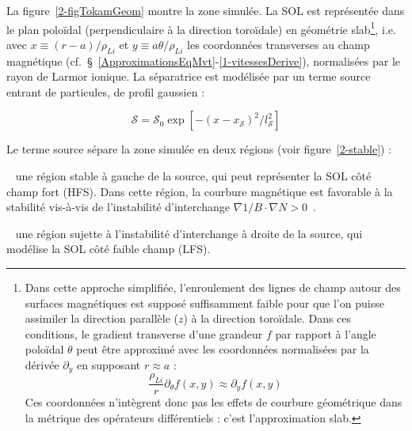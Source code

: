 \begin{refsection}
La figure~\ref{2-figTokamGeom} montre la zone simulée. La SOL est représentée dans le plan
poloïdal (perpendiculaire à la direction toroïdale)
en géométrie slab\footnote{Dans cette approche simplifiée, l'enroulement des
lignes de champ autour des surfaces magnétiques est supposé suffisamment
faible pour que l'on puisse assimiler la direction parallèle ($z$) à la
direction toroïdale. Dans ces conditions, le gradient transverse d'une
grandeur $f$ par rapport à l'angle poloïdal $\theta$ peut être approximé avec
les coordonnées normalisées par la dérivée $\partial_y$ en supposant $r\approx
a$ :
$$\frac{\rho_{Li}}{r}\partial_\theta f(x,y)\approx\partial_y
f(x,y)$$
Ces coordonnées n'intègrent donc pas les effets de courbure géométrique dans
la métrique des opérateurs différentiels : c'est l'approximation slab.}, i.e.
avec $x\equiv(r-a)/\rho_{Li}$ et $y\equiv a\theta/\rho_{Li}$ les coordonnées
transverses au champ magnétique
(cf.~\S~\ref{ApproximationsEqMvt}-\ref{1-vitessesDerive}), normalisées par le
rayon de Larmor ionique.
La séparatrice est modélisée par un terme source entrant de particules, de profil gaussien :

\begin{equation}
\mathcal S=\mathcal{S}_0 \exp[-(x-x_\mathcal{S})^2/l_\mathcal{S}^2]
\end{equation}

\begin{minipage}{1\textwidth}
\begin{minipage}{0.4\textwidth}
Le terme source sépare la zone
simulée en deux régions (voir figure~\ref{2-stable}) :

  ~ une région stable à gauche
  de la source, qui peut représenter la SOL côté champ fort (HFS\footnotemark{}).
  Dans cette région, la courbure magnétique est favorable à la stabilité vis-à-vis de l'instabilité
  d'interchange $\nabla 1/B\cdot\nabla N>0$~\parencite{Garbet}.
  
  ~ une région sujette à l'instabilité d'interchange à
  droite de la source, qui modélise la SOL côté faible champ 
  (LFS).


\end{minipage}
\end{minipage}
\end{refsection}
